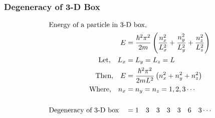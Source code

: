  \subsubsection{Degeneracy of 3-D Box}
  \begin{align*}
  \intertext{Energy of a particle in 3-D box,}
  E&= \frac{\hbar^{2} \pi^{2}}{2m}\left(  \frac{n_{x}^{2}}{L_{x}^{2}}+ \frac{n_{y}^{2}}{L_{y}^{2}}+\frac{n_{z}^{2}}{L_{z}^{2}}\right)\\
  \text{Let,}\quad L_{x}&=L_{y}=L_{z}=L\\
  \text{Then,}\quad E&= \frac{\hbar^{2} \pi^{2}}{2mL^{2}}\left({n_{x}^{2}}+ {n_{y}^{2}}+{n_{z}^{2}}\right)\\
  \text{Where,}\quad n_{x}&=n_{y}=n_{z}=1,2,3\cdots\\\\
  \text{Degeneracy of 3-D box}\quad &= 1\quad 3 \quad 3 \quad 3 \quad 3 \quad 6 \quad 3  \cdots
  \end{align*}

